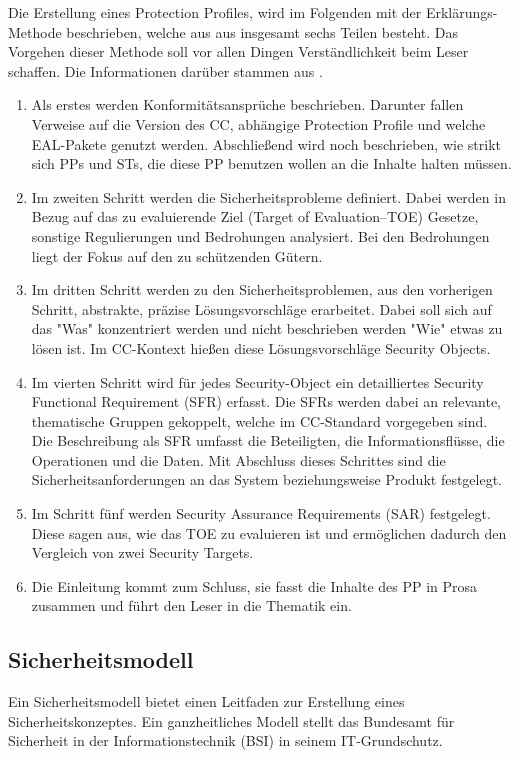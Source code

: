 \documentclass[11pt,a4paper]{report}
\begin{document}
Die Erstellung eines Protection Profiles, wird im Folgenden mit der Erklärungs-Methode beschrieben, welche aus aus insgesamt sechs Teilen besteht. Das Vorgehen dieser Methode soll vor allen Dingen Verständlichkeit beim Leser schaffen. Die Informationen darüber stammen aus \cite{bsi_ccguide}.
\begin{enumerate}
\item Als erstes werden Konformitätsansprüche beschrieben. Darunter fallen Verweise auf die Version des CC, abhängige Protection Profile und welche EAL-Pakete genutzt werden. Abschließend wird noch beschrieben, wie strikt sich PPs und STs, die diese PP benutzen wollen an die Inhalte halten müssen.
\item Im zweiten Schritt werden die Sicherheitsprobleme definiert. Dabei werden in Bezug auf das zu evaluierende Ziel (Target of Evaluation--TOE) Gesetze, sonstige Regulierungen und Bedrohungen analysiert. Bei den Bedrohungen liegt der Fokus auf den zu schützenden Gütern.
\item Im dritten Schritt werden zu den Sicherheitsproblemen, aus den vorherigen Schritt, abstrakte, präzise Lösungsvorschläge erarbeitet. Dabei soll sich auf das "Was" konzentriert werden und nicht beschrieben werden "Wie" etwas zu lösen ist. Im CC-Kontext hießen diese Lösungsvorschläge Security Objects. 
\item Im vierten Schritt wird für jedes Security-Object ein detailliertes Security Functional Requirement (SFR) erfasst. Die SFRs werden dabei an relevante, thematische Gruppen gekoppelt, welche im CC-Standard vorgegeben sind. Die Beschreibung als SFR umfasst die Beteiligten, die Informationsflüsse, die Operationen und die Daten. Mit Abschluss dieses Schrittes sind die Sicherheitsanforderungen an das System beziehungsweise Produkt festgelegt. 
\item Im Schritt fünf werden Security Assurance Requirements (SAR) festgelegt. Diese sagen aus, wie das TOE zu evaluieren ist und ermöglichen dadurch den Vergleich von zwei Security Targets.
\item Die Einleitung kommt zum Schluss, sie fasst die Inhalte des PP in Prosa zusammen und führt den Leser in die Thematik ein.
\end{enumerate}

\subsection{Sicherheitsmodell}

Ein Sicherheitsmodell bietet einen Leitfaden zur Erstellung eines Sicherheitskonzeptes. Ein ganzheitliches Modell stellt das Bundesamt für Sicherheit in der Informationstechnik (BSI) in seinem IT-Grund\-schutz.
\end{document}
